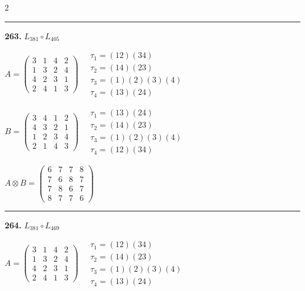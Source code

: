 \begin{multicols}{2}
\vspace{0.3em}
\hrule
\vspace{0.3em}

\noindent\textbf{263.} $L_{381} \circ L_{405}$

$A = \begin{pmatrix} 3 & 1 & 4 & 2 \\ 1 & 3 & 2 & 4 \\ 4 & 2 & 3 & 1 \\ 2 & 4 & 1 & 3 \end{pmatrix} \quad \begin{matrix} \tau_{1}=(1 2)(3 4) \\ \tau_{2}=(1 4)(2 3) \\ \tau_{3}=(1)(2)(3)(4) \\ \tau_{4}=(1 3)(2 4) \end{matrix}$

$B = \begin{pmatrix} 3 & 4 & 1 & 2 \\ 4 & 3 & 2 & 1 \\ 1 & 2 & 3 & 4 \\ 2 & 1 & 4 & 3 \end{pmatrix} \quad \begin{matrix} \tau_{1}=(1 3)(2 4) \\ \tau_{2}=(1 4)(2 3) \\ \tau_{3}=(1)(2)(3)(4) \\ \tau_{4}=(1 2)(3 4) \end{matrix}$

$A \otimes B = \begin{pmatrix} 6 & 7 & 7 & 8 \\ 7 & 6 & 8 & 7 \\ 7 & 8 & 6 & 7 \\ 8 & 7 & 7 & 6 \end{pmatrix}$

\vspace{0.3em}
\hrule
\vspace{0.3em}

\noindent\textbf{264.} $L_{381} \circ L_{469}$

$A = \begin{pmatrix} 3 & 1 & 4 & 2 \\ 1 & 3 & 2 & 4 \\ 4 & 2 & 3 & 1 \\ 2 & 4 & 1 & 3 \end{pmatrix} \quad \begin{matrix} \tau_{1}=(1 2)(3 4) \\ \tau_{2}=(1 4)(2 3) \\ \tau_{3}=(1)(2)(3)(4) \\ \tau_{4}=(1 3)(2 4) \end{matrix}$


\end{multicols}
